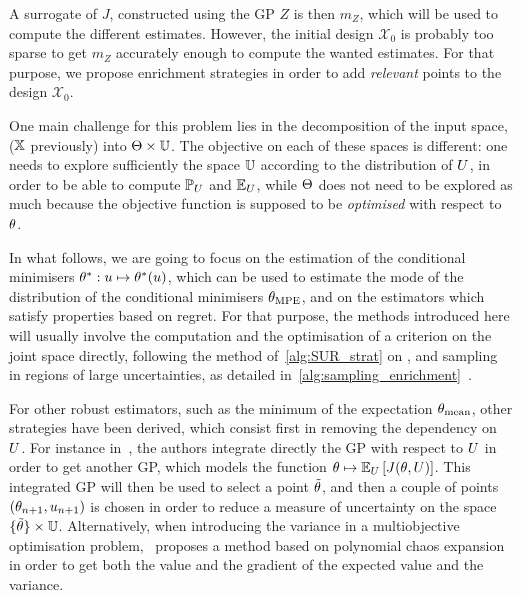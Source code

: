 \documentclass[../../Main_ManuscritThese.tex]{subfiles}
\begin{document}
A surrogate of $J$, constructed using the GP $Z$ is then $m_Z$, which
will be used to compute the different estimates. However, the initial
design $\mathcal{X}_0$ is probably too sparse to get $m_Z$ accurately
enough to compute the wanted estimates. For that purpose, we propose
enrichment strategies in order to add \emph{relevant} points to the
design $\mathcal{X}_0$.

One main challenge for this problem lies in the decomposition of the
input space, ($\mathbb{X}$ previously) into $\Theta \times \mathbb{U}$. The
objective on each of these spaces is different: one needs to explore
sufficiently the space $\mathbb{U}$ according to the distribution of
$U$, in order to be able to compute $\mathbb{P}_{U}$ and $\mathbb{E}_{U}$,
while $\Theta$ does not need to be explored as much because the
objective function is supposed to be \emph{optimised} with respect to
$\theta$.

In what follows, we are going to focus on the estimation of the
conditional minimisers $\theta^*: u\mapsto \theta^*(u)$, which can be
used to estimate the mode of the distribution of the conditional
minimisers ${\theta}_{\mathrm{MPE}}$, and on the estimators which satisfy
properties based on regret.  For that purpose, the methods introduced
here will usually involve the computation and the optimisation of a
criterion on the joint space directly, following the method
of~\cref{alg:SUR_strat} on , and sampling in
regions of large uncertainties, as detailed
in~\cref{alg:sampling_enrichment}~.

For other robust estimators, such as the minimum of the expectation
${\theta}_{\mathrm{mean}}$, other strategies have been derived, which
consist first in removing the dependency on $U$. For instance
in~\cite{janusevskis_simultaneous_2010}, the authors integrate
directly the GP with respect to $U$ in order to get another GP,
which models the function
$\theta\mapsto \mathbb{E}_{U}\left[J(\theta, U)\right]$. This integrated GP
will then be used to select a point $\tilde{\theta}$, and then a couple
of points $(\theta_{n+1},u_{n+1})$ is chosen in order to reduce a
measure of uncertainty on the space $\{\tilde{\theta}\}\times \mathbb{U}$.
Alternatively, when introducing the variance in a multiobjective
optimisation problem,~\cite{miranda_adjoint-based_2016} proposes a
method based on polynomial chaos expansion in order to get both the
value and the gradient of the expected value and the variance.


\end{document}
